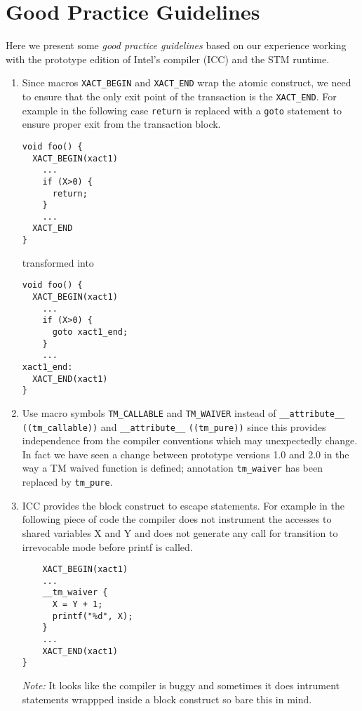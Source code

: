 \section{Good Practice Guidelines}
Here we present some {\em good practice guidelines} based on our experience 
working with the prototype edition of Intel's compiler (ICC) and the STM 
runtime.

\begin{enumerate}

\item Since macros \verb!XACT_BEGIN! and \verb!XACT_END! wrap the atomic
construct, we need to ensure that the only exit point of the transaction
is the \verb!XACT_END!. For example in the following case \verb!return!
is replaced with a \verb!goto! statement to ensure proper exit from the
transaction block.

\begin{verbatim}
void foo() {
  XACT_BEGIN(xact1)
    ...
    if (X>0) {
      return;
    }
    ...
  XACT_END
}
\end{verbatim}

transformed into

\begin{verbatim}
void foo() {
  XACT_BEGIN(xact1)
    ...
    if (X>0) {
      goto xact1_end;
    }
    ...
xact1_end:
  XACT_END(xact1)
}
\end{verbatim}


\item Use macro symbols \verb!TM_CALLABLE! and \verb!TM_WAIVER! instead of 
\verb!__attribute__! \verb!((tm_callable))! and \verb!__attribute__! 
\verb!((tm_pure))! since
this provides independence from the compiler conventions which may unexpectedly 
change. In fact we have seen a change between prototype versions 
1.0 and 2.0 in the way a TM waived function is defined; annotation  
\verb!tm_waiver! has been replaced by \verb!tm_pure!.

\item ICC provides the \tmwaiver block construct to escape statements. For
example in the following piece of code the compiler does not instrument
the accesses to shared variables X and Y and does not generate any call for 
transition to irrevocable mode before printf is called. 
 
\begin{verbatim}
	XACT_BEGIN(xact1)  
    ...
    __tm_waiver {
      X = Y + 1;
      printf("%d", X); 
    }
    ...
	XACT_END(xact1)  
}
\end{verbatim}

{\em Note:} It looks like the compiler is buggy and sometimes it does intrument
statements wrappped inside a \tmwaiver block construct so bare this in mind. 




\end{enumerate}
